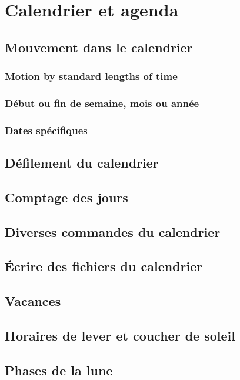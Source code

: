 \chapter{Calendrier et agenda}\label{chap28}
\section{Mouvement dans le calendrier}\label{chap28sec1}
\subsection{Motion by standard lengths of time}\label{chap28sec1subec1}
\subsection{Début ou fin de semaine, mois ou année}\label{chap28sec1subsec2}
\subsection{Dates spécifiques}\label{chap28sec1subsec3}
\section{Défilement du calendrier}\label{chap28sec2}
\section{Comptage des jours}\label{chap28sec3}
\section{Diverses commandes du calendrier}\label{chap28sec4}
\section{\'Ecrire des fichiers du calendrier}\label{chap28sec5}
\section{Vacances}\label{chap28sec6}
\section{Horaires de lever et coucher de soleil}\label{chap28sec7}
\section{Phases de la lune}\label{chap28sec8}
